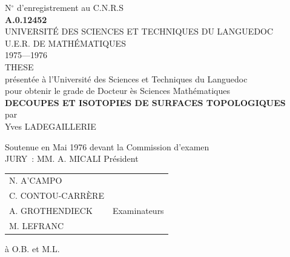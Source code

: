 \documentclass[12pt,twoside]{report} %
\begin{document}
\thispagestyle{empty}
\vspace*{\fill}
\begin{center}
    {\large N$^\circ$ d'enregistrement au C.N.R.S} \\
    \vspace{0.5em}
    {\bf A.0.12452} \\
    \vspace{4em}
    {\large UNIVERSITÉ DES SCIENCES ET TECHNIQUES DU LANGUEDOC} \\
    \vspace{0.5em}
    {\large U.E.R. DE MATHÉMATIQUES} \\
    \vspace{1em}
    1975---1976 \\
	THESE \\
    présentée à l'Université des Sciences et Techniques du Languedoc \\
	pour obtenir le grade de Docteur ès Sciences Mathématiques\\ 
	\vspace{2em}
    {\Large \bf DECOUPES ET ISOTOPIES DE SURFACES TOPOLOGIQUES} \\
    \vspace{2em}
    par \\
    \vspace{2em}
    {\Large Yves LADEGAILLERIE} \\
\end{center}
\vspace*{\fill}
\begin{center}
    Soutenue en Mai 1976 devant la Commission d'examen \\
	\vspace{1em}
    JURY~: MM. A. MICALI \quad\quad Président \\
    \vspace{0.5em}
\begin{tabular}{@{}l@{\hspace{3cm}}r@{}}
N. A'CAMPO & \\ 
C. CONTOU-CARRÈRE & \\ 
A. GROTHENDIECK & Examinateurs \\
M. LEFRANC & \\ 
\end{tabular}
\end{center}
\vspace*{\fill}

\newpage 
\thispagestyle{empty}

\null\vfill
\begin{flushright}
à O.B. et M.L.
\end{flushright}
\vfill\null
\end{document}
